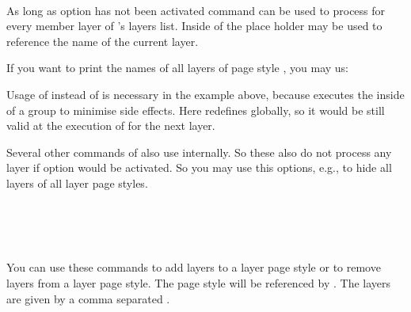 \begin{Declaration}
  \\
\end{Declaration}
%
As long as \KOMAScript{} option  has not
been activated command  can be used to process
 for every member layer of 's layers
list. Inside of  the place holder  may be used to
reference the name of the current layer.
\begin{Example}
  If you want to print the names of all layers of page style
  , you may us:
\begin{lstcode}
  \let\commaatlist\empty
  \ForEachLayerOfPageStyle{scrheadings}{%
    \commaatlist#1\gdef\commaatlist{, }}
\end{lstcode}
\end{Example}
Usage of  instead of  is necessary in the example
above, because  executes the 
inside of a group to minimise side effects. Here  redefines
 globally, so it would be still valid at the execution of
 for the next layer.

Several other commands of  also
use  internally. So these also do not process
any layer if \KOMAScript{} option  would be
activated. So you may use this options, e.g., to hide all layers of all layer
page styles.%
%

\begin{Declaration}
  \\
  \\
  \\
\end{Declaration}
%
%
%
%
You can use these commands to add layers to a layer page style or to remove 
layers from a layer page style. The page style will be referenced by
. The layers are given by a comma separated
. 

